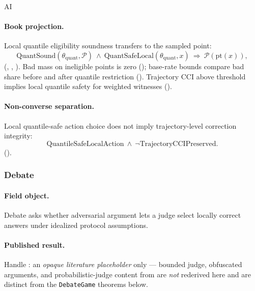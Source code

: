 \begin{authbar}{AI}
\paragraph{Book projection.}
Local quantile eligibility soundness transfers to the sampled point:
\begin{equation}
\label{appi:eq:quant-soundness}
\mathrm{QuantSound}(\theta_{\mathrm{quant}},\mathcal P)\ \wedge\ \mathrm{QuantSafeLocal}(\theta_{\mathrm{quant}},x)
\ \Rightarrow\ \mathcal P(\mathrm{pt}(x)),
\end{equation}
(, , ).
Bad mass on ineligible points is zero (); base-rate bounds compare bad share before and after quantile restriction ().
Trajectory \(\mathrm{CCI}\) above threshold implies local quantile safety for weighted witnesses ().

\paragraph{Non-converse separation.}
Local quantile-safe action choice does not imply trajectory-level correction integrity:
\begin{equation}
\label{appi:eq:quant-separation}
\mathrm{QuantileSafeLocalAction}\ \wedge\ \neg\mathrm{TrajectoryCCIPreserved}.
\end{equation}
().

\subsubsection{Debate \autocite{irving2018debate}}
\label{sec:appi-field-debate}

\paragraph{Field object.}
Debate asks whether adversarial argument lets a judge select locally correct answers under idealized protocol assumptions.

\paragraph{Published result.}
Handle : an \emph{opaque literature placeholder} only --- bounded judge, obfuscated arguments, and probabilistic-judge content from \autocite{irving2018debate} are \emph{not} rederived here and are distinct from the \texttt{DebateGame} theorems below.


\end{authbar}
